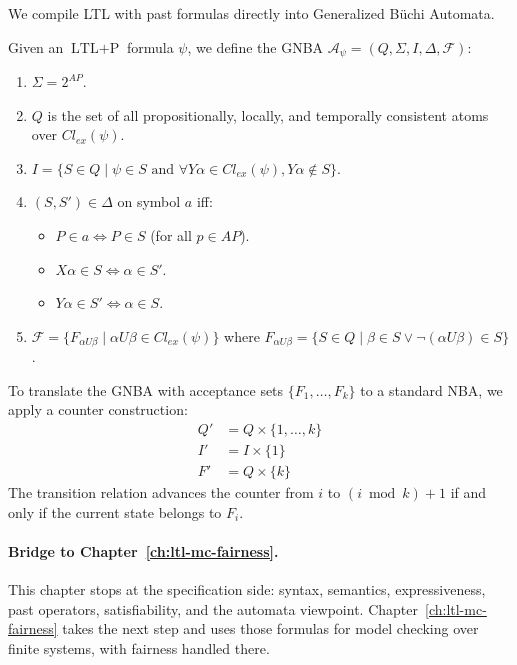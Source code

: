 We compile LTL with past formulas directly into Generalized B\"uchi Automata.

\begin{definition}
Given an $\text{LTL}+\text{P}$ formula $\psi$, we define the GNBA $\mathcal{A}_\psi = (Q, \Sigma, I, \Delta, \mathcal{F})$:
\begin{enumerate}
    \item $\Sigma = 2^{AP}$.
    \item $Q$ is the set of all propositionally, locally, and temporally consistent atoms over $Cl_{ex}(\psi)$.
    \item $I = \{ S \in Q \mid \psi \in S \text{ and } \forall Y\alpha \in Cl_{ex}(\psi), Y\alpha \notin S \}$.
    \item $(S, S') \in \Delta$ on symbol $a$ iff:
          \begin{itemize}
              \item $P \in a \iff P \in S$ (for all $p \in AP$).
              \item $X \alpha \in S \iff \alpha \in S'$.
              \item $Y \alpha \in S' \iff \alpha \in S$.
          \end{itemize}
    \item $\mathcal{F} = \{ F_{\alpha U \beta} \mid \alpha U \beta \in Cl_{ex}(\psi) \}$ where $F_{\alpha U \beta} = \{ S \in Q \mid \beta \in S \lor \neg(\alpha U \beta) \in S \}$.
\end{enumerate}
\end{definition}

To translate the GNBA with acceptance sets $\{F_1, \dots, F_k\}$ to a standard NBA, we apply a counter construction:
\begin{align*}
  Q' &= Q \times \{1, \dots, k\} \\
  I' &= I \times \{1\} \\
  F' &= Q \times \{k\}
\end{align*}
The transition relation advances the counter from $i$ to $(i \bmod k) + 1$ if and only if the current state belongs to $F_i$.

\paragraph{Bridge to Chapter~\ref{ch:ltl-mc-fairness}.}
This chapter stops at the specification side: syntax, semantics, expressiveness, past operators, satisfiability, and the automata viewpoint.  Chapter~\ref{ch:ltl-mc-fairness} takes the next step and uses those formulas for model checking over finite systems, with fairness handled there.

